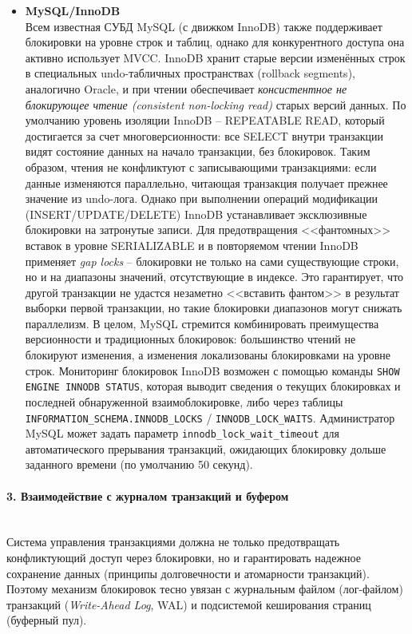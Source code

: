 \begin{itemize}
    \item \textbf{MySQL/InnoDB} \autocite{Mysqldoc4} ~\\
    Всем известная СУБД MySQL (с движком InnoDB) также поддерживает блокировки на уровне строк и таблиц, однако для конкурентного доступа она активно использует MVCC. InnoDB хранит старые версии изменённых строк в специальных undo-табличных пространствах (rollback segments), аналогично Oracle, и при чтении обеспечивает \textit{консистентное не блокирующее чтение (consistent non-locking read)} старых версий данных. По умолчанию уровень изоляции InnoDB – REPEATABLE READ, который достигается за счет многоверсионности: все SELECT внутри транзакции видят состояние данных на начало транзакции, без блокировок. Таким образом, чтения не конфликтуют с записывающими транзакциями: если данные изменяются параллельно, читающая транзакция получает прежнее значение из undo-лога. Однако при выполнении операций модификации (INSERT/UPDATE/DELETE) InnoDB устанавливает эксклюзивные блокировки на затронутые записи. Для предотвращения <<фантомных>> вставок в уровне SERIALIZABLE и в повторяемом чтении InnoDB применяет \textit{gap locks} – блокировки не только на сами существующие строки, но и на диапазоны значений, отсутствующие в индексе. Это гарантирует, что другой транзакции не удастся незаметно <<вставить фантом>> в результат выборки первой транзакции, но такие блокировки диапазонов могут снижать параллелизм. В целом, MySQL стремится комбинировать преимущества версионности и традиционных блокировок: большинство чтений не блокируют изменения, а изменения локализованы блокировками на уровне строк. Мониторинг блокировок InnoDB возможен с помощью команды \texttt{SHOW ENGINE INNODB STATUS}, которая выводит сведения о текущих блокировках и последней обнаруженной взаимоблокировке, либо через таблицы \texttt{INFORMATION\_SCHEMA.INNODB\_LOCKS} / \texttt{INNODB\_LOCK\_WAITS}. Администратор MySQL может задать параметр \texttt{innodb\_lock\_wait\_timeout} для автоматического прерывания транзакций, ожидающих блокировку дольше заданного времени (по умолчанию 50 секунд).
 \end{itemize}

\paragraph{3. Взаимодействие с журналом транзакций и буфером} ~\\

 Система управления транзакциями должна не только предотвращать конфликтующий доступ через блокировки, но и гарантировать надежное сохранение данных (принципы долговечности и атомарности транзакций). Поэтому механизм блокировок тесно увязан с журнальным файлом (лог-файлом) транзакций (\textit{Write-Ahead Log}, WAL) и подсистемой кеширования страниц (буферный пул). 
 
